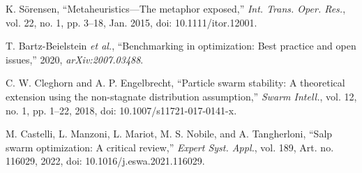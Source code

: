 K. S\"orensen, ``Metaheuristics---The metaphor exposed,'' \textit{Int. Trans. Oper. Res.}, vol. 22, no. 1, pp. 3--18, Jan. 2015, doi: 10.1111/itor.12001.

T. Bartz-Beielstein \textit{et al.}, ``Benchmarking in optimization: Best practice and open issues,'' 2020, \textit{arXiv:2007.03488}.

C. W. Cleghorn and A. P. Engelbrecht, ``Particle swarm stability: A theoretical extension using the non-stagnate distribution assumption,'' \textit{Swarm Intell.}, vol. 12, no. 1, pp. 1--22, 2018, doi: 10.1007/s11721-017-0141-x.

M. Castelli, L. Manzoni, L. Mariot, M. S. Nobile, and A. Tangherloni, ``Salp swarm optimization: A critical review,'' \textit{Expert Syst. Appl.}, vol. 189, Art. no. 116029, 2022, doi: 10.1016/j.eswa.2021.116029.
